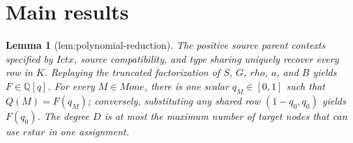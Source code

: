 \documentclass{article}
\newtheorem{lemma}{Lemma}
\begin{document}
\section{Main results}

\begin{lemma}[lem:polynomial-reduction]\label{lem:polynomial-reduction}
The positive source parent contexts specified by \(Ictx\), source compatibility, and type sharing uniquely recover every row in \(K\). Replaying the truncated factorization of \(S\), \(G\), \(rho\), \(a\), and \(B\) yields \(F\in\mathbb Q[q]\). For every \(M\in Mone\), there is one scalar \(q_M\in[0,1]\) such that \(Q(M)=F(q_M)\); conversely, substituting any shared row \((1-q_0,q_0)\) yields \(F(q_0)\). The degree \(D\) is at most the maximum number of target nodes that can use \(rstar\) in one assignment.
\end{lemma}
\end{document}
